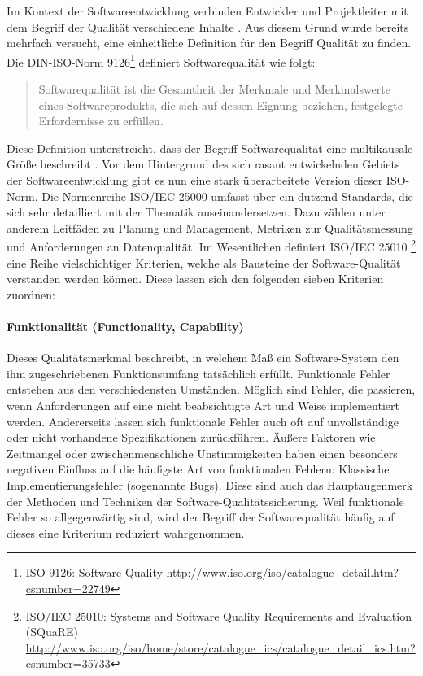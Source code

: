 Im Kontext der Softwareentwicklung verbinden Entwickler und Projektleiter mit dem Begriff der Qualität verschiedene Inhalte \cite{hoffmann_software-qualitat_2013}. Aus diesem Grund wurde bereits mehrfach versucht, eine einheitliche Definition für den Begriff Qualität zu finden. Die DIN-ISO-Norm 9126\footnote{ISO 9126: Software Quality \url{http://www.iso.org/iso/catalogue_detail.htm?csnumber=22749}} definiert Softwarequalität wie folgt:

\begin{quote}
Softwarequalität ist die Gesamtheit der Merkmale und Merkmalswerte eines Softwareprodukts, die sich auf dessen Eignung beziehen, festgelegte Erfordernisse zu erfüllen.
\end{quote}

Diese Definition unterstreicht, dass der Begriff Softwarequalität eine multikausale Größe beschreibt \cite{hoffmann_software-qualitat_2013}. Vor dem Hintergrund des sich rasant entwickelnden Gebiets der Softwareentwicklung gibt es nun eine stark überarbeitete Version dieser ISO-Norm. Die Normenreihe ISO/IEC 25000 umfasst über ein dutzend Standards, die sich sehr detailliert mit der Thematik auseinandersetzen. Dazu zählen unter anderem Leitfäden zu Planung und Management, Metriken zur Qualitätsmessung und Anforderungen an Datenqualität. Im Wesentlichen definiert ISO/IEC 25010 \footnote{ISO/IEC 25010: Systems and Software Quality Requirements and Evaluation (SQuaRE) \url{http://www.iso.org/iso/home/store/catalogue_ics/catalogue_detail_ics.htm?csnumber=35733}} eine Reihe vielschichtiger Kriterien, welche als Bausteine der Software-Qualität verstanden werden können. Diese lassen sich den folgenden sieben Kriterien zuordnen:

\paragraph{Funktionalität (Functionality, Capability)} Dieses Qualitätsmerkmal beschreibt, in welchem Maß ein Software-System den ihm zugeschriebenen Funktionsumfang tatsächlich erfüllt. Funktionale Fehler entstehen aus den verschiedensten Umständen. Möglich sind Fehler, die passieren, wenn Anforderungen auf eine nicht beabsichtigte Art und Weise implementiert werden. Andererseits lassen sich funktionale Fehler auch oft auf unvollständige oder nicht vorhandene Spezifikationen zurückführen. Äußere Faktoren wie Zeitmangel oder zwischenmenschliche Unstimmigkeiten haben einen besonders negativen Einfluss auf die häufigste Art von funktionalen Fehlern: Klassische Implementierungsfehler (sogenannte \Glspl{Bug}). Diese sind auch das Hauptaugenmerk der Methoden und Techniken der Software-Qualitätssicherung. Weil funktionale Fehler so allgegenwärtig sind, wird der Begriff der Softwarequalität häufig auf dieses eine Kriterium reduziert wahrgenommen.

